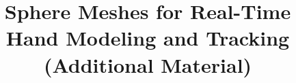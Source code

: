 \title{Sphere Meshes for Real-Time Hand Modeling and Tracking
\\ (Additional Material)}

\maketitle

\newpage

\clearpage




\clearpage




